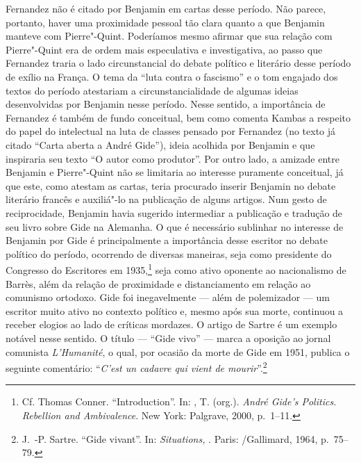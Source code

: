 Fernandez não é citado por Benjamin em cartas desse período. Não parece,
portanto, haver uma proximidade pessoal tão clara quanto a que Benjamin
manteve com Pierre"-Quint. Poderíamos mesmo afirmar que sua relação com
Pierre"-Quint era de ordem mais especulativa e investigativa, ao passo
que Fernandez traria o lado circunstancial do debate político e
literário desse período de exílio na França. O tema da ``luta contra o
fascismo'' e o tom engajado dos textos do período atestariam a
circunstancialidade de algumas ideias desenvolvidas por Benjamin nesse
período. Nesse sentido, a importância de Fernandez é também de fundo
conceitual, bem como comenta Kambas a respeito do papel do intelectual
na luta de classes pensado por Fernandez (no texto já citado ``Carta
aberta a André Gide''), ideia acolhida por Benjamin e que inspiraria seu
texto ``O autor como produtor''. Por outro lado, a amizade entre
Benjamin e Pierre"-Quint não se limitaria ao interesse puramente
conceitual, já que este, como atestam as cartas, teria procurado
inserir Benjamin no debate literário francês e auxiliá"-lo na publicação
de alguns artigos. Num gesto de reciprocidade, Benjamin havia sugerido intermediar a publicação e tradução de seu livro sobre Gide na Alemanha. O que é
necessário sublinhar no interesse de Benjamin por Gide é
principalmente a importância desse escritor no debate político do
período, ocorrendo de diversas maneiras, seja como presidente do
Congresso do Escritores em 1935,\footnote{Cf. Thomas Conner.
  ``Introduction''. In: , T. (org.). \emph{André Gide's Politics.
  Rebellion and Ambivalence}. New York: Palgrave, 2000, p.~1--11.} seja
como ativo oponente ao nacionalismo de Barrès, além da relação de
proximidade e distanciamento em relação ao comunismo ortodoxo. Gide foi
inegavelmente --- além de polemizador --- um escritor muito ativo no
contexto político e, mesmo após sua morte, continuou a receber elogios
ao lado de críticas mordazes. O artigo de Sartre é um exemplo notável
nesse sentido. O título --- ``Gide vivo'' --- marca a oposição ao jornal
comunista \emph{L'Humanité}, o qual, por ocasião da morte de Gide em
1951, publica o seguinte comentário: ``\emph{C'est un cadavre qui vient de
mourir}''.\footnote{J.~-P. Sartre. ``Gide vivant''. In: \emph{Situations, }. Paris: /Gallimard, 1964, p.~75--79.}

